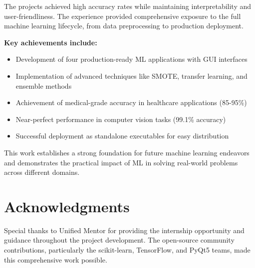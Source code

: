 \documentclass[12pt, a4paper]{article}
\begin{document}
The projects achieved high accuracy rates while maintaining interpretability and user-friendliness. The experience provided comprehensive exposure to the full machine learning lifecycle, from data preprocessing to production deployment.

\textbf{Key achievements include:}
\begin{itemize}
    \item Development of four production-ready ML applications with GUI interfaces
    \item Implementation of advanced techniques like SMOTE, transfer learning, and ensemble methods
    \item Achievement of medical-grade accuracy in healthcare applications (85-95\%)
    \item Near-perfect performance in computer vision tasks (99.1\% accuracy)
    \item Successful deployment as standalone executables for easy distribution
\end{itemize}

This work establishes a strong foundation for future machine learning endeavors and demonstrates the practical impact of ML in solving real-world problems across different domains.

\section{Acknowledgments}

Special thanks to Unified Mentor for providing the internship opportunity and guidance throughout the project development. The open-source community contributions, particularly the scikit-learn, TensorFlow, and PyQt5 teams, made this comprehensive work possible.
\end{document}

